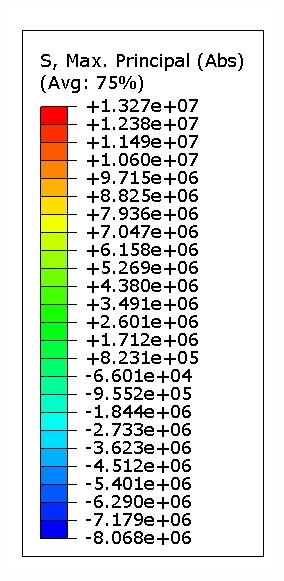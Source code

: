 \documentclass[preprint,review,12pt]{elsarticle}
\begin{document}
\begin{figure}[htbp]
\begin{minipage}[t]{0.28\textwidth}
\centering
\vspace{-2cm}
\includegraphics[width=\textwidth]{Abaqus/XFEM/XFEM_scale.jpg}

\end{minipage}
\end{figure}
\end{document}
